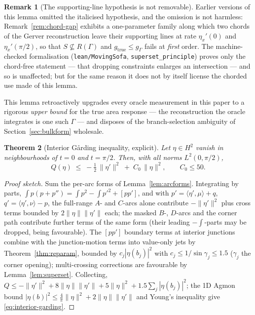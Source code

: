 \documentclass[11pt]{amsart}
\theoremstyle{plain}
\newtheorem{theorem}{Theorem}
\theoremstyle{definition}
\newtheorem{remark}[theorem]{Remark}
\begin{document}
\begin{remark}[The supporting-line hypothesis is not removable]
\label{rem:chord-hypothesis}
Earlier versions of this lemma omitted the italicised hypothesis, and
the omission is not harmless: Remark~\ref{rem:chord-gap} exhibits a
one-parameter family along which two chords of the Gerver
reconstruction leave their supporting lines at rate $\eta_{x}'(0)$ and
$\eta_{x}'(\pi/2)$, so that $S\not\subseteq R(\Gamma)$ and
$g_{\mathrm{true}} \leq g_{\Gamma}$ fails at \emph{first} order.  The
machine-checked formalisation
(\texttt{lean/MovingSofa}, \texttt{superset\_principle}) proves only the
chord-free statement --- that dropping constraints enlarges an
intersection --- and so is unaffected; but for the same reason it does
not by itself license the chorded use made of this lemma.
\end{remark}

This lemma retroactively upgrades every oracle measurement in this
paper to a rigorous \emph{upper bound} for the true area response ---
the reconstruction the oracle integrates is one such $\Gamma$ --- and
disposes of the branch-selection ambiguity of
Section~\ref{sec:bulkform} wholesale.

\begin{theorem}[Interior G\aa rding inequality, explicit]
\label{thm:interior-garding}
Let $\eta \in H^{2}$ vanish in neighbourhoods of $t=0$ and $t=\pi/2$.
Then, with all norms $L^{2}(0,\pi/2)$,
\begin{equation}\label{eq:interior-garding}
   Q(\eta) \;\leq\; -\tfrac12\,\|\eta'\|^{2} \;+\; C_{0}\,\|\eta\|^{2},
   \qquad C_{0} \leq 50 .
\end{equation}
\end{theorem}

\begin{proof}[Proof sketch]
Sum the per-arc forms of Lemma~\ref{lem:arcforms}.  Integrating by
parts, $\int p(p+p'') = \int p^{2} - \int p'^{2} + [pp']$, and with $p'
= \langle\eta',\mu\rangle + q$, $q' = \langle\eta',\nu\rangle - p$, the
full-range $A$- and $C$-arcs alone contribute $-\|\eta'\|^{2}$ plus
cross terms bounded by $2\|\eta\|\|\eta'\|$ each; the masked $B$-,
$D$-arcs and the corner path contribute further terms of the same form
(their leading $-\int$-parts may be dropped, being favourable).  The
$[pp']$ boundary terms at interior junctions combine with the
junction-motion terms into value-only jets by
Theorem~\ref{thm:reparam}, bounded by $c_{j}|\eta(b_{j})|^{2}$ with
$c_{j} \leq 1/\sin\gamma_{j} \leq 1.5$ ($\gamma_{j}$ the corner
opening); multi-crossing corrections are favourable by
Lemma~\ref{lem:superset}.  Collecting, $Q \leq -\|\eta'\|^{2} +
8\|\eta\|\|\eta'\| + 5\|\eta\|^{2} + 1.5\sum_{j}|\eta(b_{j})|^{2}$;
the 1D Agmon bound $|\eta(b)|^{2} \leq \tfrac{4}{\pi}\|\eta\|^{2} +
2\|\eta\|\|\eta'\|$ and Young's inequality give
\eqref{eq:interior-garding}.
\end{proof}
\end{document}
